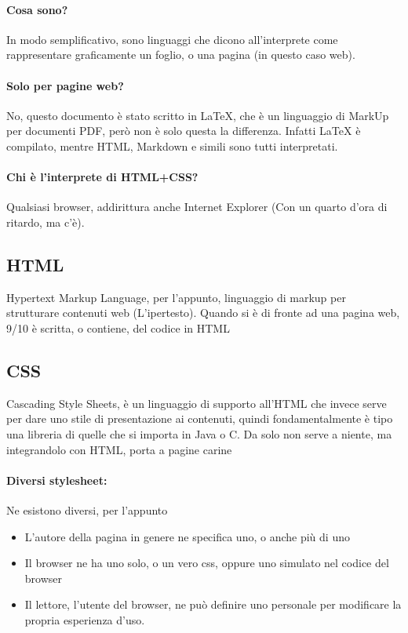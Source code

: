 \documentclass[12pt, a4paper, openany, twoside]{book}
\begin{document}
\paragraph{Cosa sono?} In modo semplificativo, sono linguaggi che dicono 
all'interprete come rappresentare graficamente un foglio, o una pagina (in questo
caso web). 
\paragraph{Solo per pagine web?} No, questo documento è stato scritto in LaTeX, 
che è un linguaggio di MarkUp per documenti PDF, però non è solo questa la differenza.
Infatti LaTeX è compilato, mentre HTML, Markdown e simili sono tutti interpretati.
\paragraph{Chi è l'interprete di HTML+CSS?} Qualsiasi browser, addirittura anche
Internet Explorer (Con un quarto d'ora di ritardo, ma c'è).
\subsection{HTML}
Hypertext Markup Language, per l'appunto, linguaggio di markup per strutturare contenuti
web (L'ipertesto). Quando si è di fronte ad una pagina web, 9/10 è scritta, o 
contiene, del codice in HTML
\subsection{CSS}
Cascading Style Sheets, è un linguaggio di supporto all'HTML che invece serve per
dare uno stile di presentazione ai contenuti, quindi fondamentalmente è tipo una
libreria di quelle che si importa in Java o C. Da solo non serve a niente, ma 
integrandolo con HTML, porta a pagine carine
\paragraph{Diversi stylesheet:} Ne esistono diversi, per l'appunto \\
\begin{itemize}
	\item L'autore della pagina in genere ne specifica uno, o anche più di uno
	\item Il browser ne ha uno solo, o un vero css, oppure uno simulato nel codice
	del browser
	\item Il lettore, l'utente del browser, ne può definire uno personale per
	modificare la propria esperienza d'uso.
\end{itemize}
\end{document}
